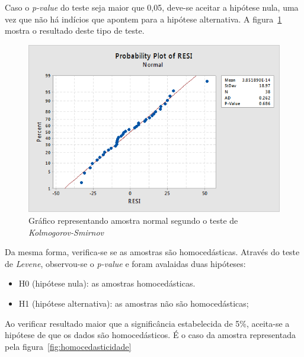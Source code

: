 \documentclass[12pt,openany,oneside,a4paper,english,brazil]{abntbibufjf}
\begin{document}
    Caso o \textit{p-value} do teste seja maior que 0,05, deve-se aceitar a hipótese nula, uma vez que não há indícios que apontem para a hipótese alternativa. A figura~\ref{fig:normalidade} mostra o resultado deste tipo de teste.

    \begin{figure}[H]
    \centering
      \includegraphics[width=\linewidth]{shapiro.png}
    \caption{Gráfico representando amostra normal segundo o teste de \textit{Kolmogorov-Smirnov} \cite{pensu2017}}
    \label{fig:normalidade}
    \end{figure}

    Da mesma forma, verifica-se se as amostras são homocedásticas. Através do teste de \textit{Levene}, observou-se o \textit{p-value} e foram avalaidas duas hipóteses:

    \begin{itemize}
      \item H0 (hipótese nula): as amostras homocedásticas.
      \item H1 (hipótese alternativa): as amostras não são homocedásticas;
    \end{itemize}

    Ao verificar resultado maior que a significância estabelecida de 5\%, aceita-se a hipótese de que os dados são homocedásticos. É o caso da amostra representada pela figura~\ref{fig:homocedasticidade}
\end{document}
